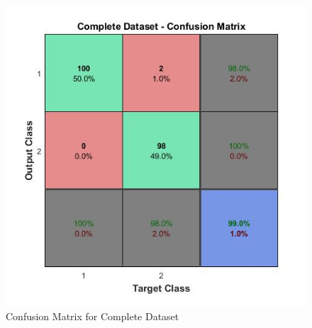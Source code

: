 \documentclass[10pt, letterpaper]{article}
\begin{document}
\begin{enumerate}
\begin{figure}[h!]
\centering
\includegraphics[scale=0.5]{CompleteDataset-Confusion-2.jpg}
\caption{Confusion Matrix for Complete Dataset}
\label{Fig:ConfCompleteData}
\end{figure} 
\end{enumerate}

\newpage
\end{document}
